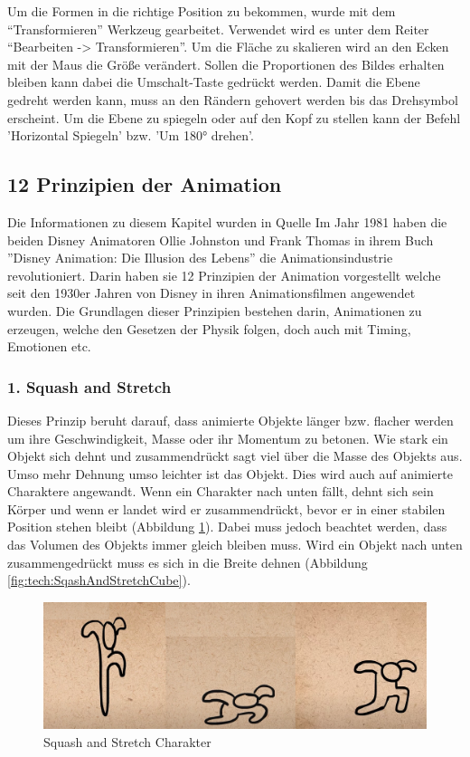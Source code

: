 Um die Formen in die richtige Position zu bekommen, wurde mit dem ``Transformieren'' Werkzeug
gearbeitet. Verwendet wird es unter dem Reiter ``Bearbeiten -> Transformieren''.
Um die Fläche zu skalieren wird an den Ecken mit der Maus die Größe verändert. Sollen die Proportionen des Bildes erhalten bleiben
kann dabei die Umschalt-Taste gedrückt werden. Damit die Ebene gedreht werden kann, muss an den Rändern gehovert werden bis das Drehsymbol erscheint.
Um die Ebene zu spiegeln oder auf den Kopf zu stellen kann der Befehl 'Horizontal Spiegeln' bzw. 'Um 180° drehen'.

\subsection{12 Prinzipien der Animation}
Die Informationen zu diesem Kapitel wurden in Quelle \cite{principles}
Im Jahr 1981 haben die beiden Disney Animatoren Ollie Johnston und Frank Thomas in ihrem Buch ''Disney Animation: Die Illusion des Lebens'' die Animationsindustrie revolutioniert.
Darin haben sie 12 Prinzipien der Animation vorgestellt welche seit den 1930er Jahren von Disney in ihren Animationsfilmen angewendet wurden.
Die Grundlagen dieser Prinzipien bestehen darin, Animationen zu erzeugen, welche den Gesetzen der Physik folgen, doch auch mit Timing, Emotionen etc.

\subsubsection{1. Squash and Stretch}
Dieses Prinzip beruht darauf, dass animierte Objekte länger bzw. flacher werden um ihre Geschwindigkeit, Masse oder ihr Momentum zu betonen.
Wie stark ein Objekt sich dehnt und zusammendrückt sagt viel über die Masse des Objekts aus. Umso mehr Dehnung umso leichter ist das Objekt.
Dies wird auch auf animierte Charaktere angewandt. Wenn ein Charakter nach unten fällt, dehnt sich sein Körper und wenn er landet wird er zusammendrückt, bevor er in einer stabilen Position stehen bleibt (Abbildung \ref{fig:tech:SqashAndStretch}).
Dabei muss jedoch beachtet werden, dass das Volumen des Objekts immer gleich bleiben muss. Wird ein Objekt nach unten zusammengedrückt muss es sich in die Breite dehnen (Abbildung \ref{fig:tech:SqashAndStretchCube}).
\begin{figure}[H]
  \centering
  \includegraphics[scale=0.5]{pics/SqashAndStretch.png}
  \caption{Squash and Stretch Charakter}
  \label{fig:tech:SqashAndStretch}
\end{figure}

